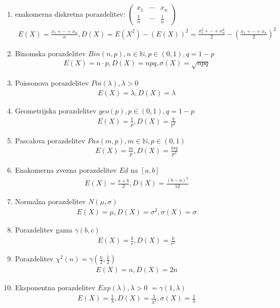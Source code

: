 \documentclass[a4paper,12pt]{article}
\theoremstyle{definition}
\theoremstyle{remark}
\newcommand{\N}{\mathbb{N}}
\begin{document}
\begin{enumerate}
    \item enakomerna diskretna porazdelitev: $\begin{pmatrix}x_1 & \cdots & x_n \\ \frac{1}{n} & \cdots & \frac{1}{n}\end{pmatrix}$
        \begin{align*}
            E(X) = \frac{x_1 + \cdots + x_n}{n}, D(X) = E(X^2) - (E(X))^2 = \frac{x_1^2 + \cdots + x_n^2}{2} -
            (\frac{x_1 + \cdots + x_n}{2})^2
        \end{align*}
    \item Binomska porazdelitev $Bin(n,p), n \in \N, p \in (0,1), q = 1-p$
        \begin{align*}
            E(X) = n \cdot p, D(X) = npq, \sigma(X) = \sqrt{npq}
        \end{align*}
    \item Poissonova porazdelitev $Poi(\lambda), \lambda > 0$
        \begin{align*}
            E(X) = \lambda, D(X) = \lambda
        \end{align*}
    \item Geometrijska porazdelitev $geo(p), p \in (0,1), q = 1-p$
        \begin{align*}
            E(X) = \frac{1}{p}, D(X) = \frac{q}{p^2}
        \end{align*}
    \item Pascalova porazdelitev $Pas(m,p), m \in \N, p \in (0,1)$
        \begin{align*}
            E(X) = \frac{m}{p}, D(X) = \frac{mq}{p^2}
        \end{align*}
    \item Enakomerna zvezna porazdelitev $Ed$ na $[a,b]$    %
        \begin{align*}
            E(X) = \frac{a+b}{2}, D(X) = \frac{(b-a)^2}{12}
        \end{align*}
    \item Normalna porazdelitev $N(\mu, \sigma)$
        \begin{align*}
            E(X) = \mu, D(X) = \sigma^2, \sigma(X) = \sigma
        \end{align*}
    \item Porazdelitev gama $\gamma(b,c)$
        \begin{align*}
            E(X) = \frac{b}{c}, D(X) = \frac{b}{c^2}
        \end{align*}
    \item Porazdelitev $\chi^2(n) = \gamma(\frac{n}{2}, \frac{1}{2})$
        \begin{align*}
            E(X) = n, D(X) = 2n
        \end{align*}
    \item Eksponentna porazdelitev $Exp(\lambda), \lambda > 0$ $= \gamma(1,\lambda)$
        \begin{align*}
            E(X) = \frac{1}{\lambda}, D(X) = \frac{1}{\lambda^2}, \sigma(X) = \frac{1}{\lambda}
        \end{align*}
\end{enumerate}
\end{document}
